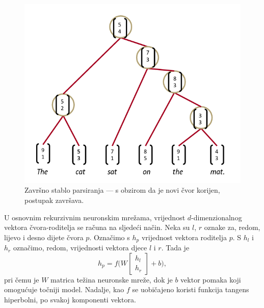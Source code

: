 \documentclass[a4paper,twoside,12pt]{memoir} %
\begin{document}
	\begin{figure}[H]
		\centering
		\vspace*{-24pt}
		\includegraphics[scale = 0.70]{recursive_parse_4.png}

		\vspace*{-6pt}
		\caption{Završno stablo parsiranja --- s obzirom da je novi čvor korijen, postupak završava.}
	\end{figure}

	U osnovnim rekurzivnim neuronskim mrežama, vrijednost $d$-dimenzionalnog vektora čvora-roditelja se računa na sljedeći način. Neka su $l$, $r$ oznake za, redom, lijevo i desno dijete čvora $p$. Označimo s $h_p$ vrijednost vektora roditelja $p$. S $h_l$ i $h_r$ označimo, redom, vrijednosti vektora djece $l$ i $r$. Tada je
	\begin{equation*}
	h_p = f \bigg(
	W
	\begin{bmatrix}
	h_l \\
	h_r
	\end{bmatrix}
	+ b
	\bigg),
	\end{equation*}
	pri čemu je $W$ matrica težina neuronske mreže, dok je $b$ vektor pomaka koji omogućuje točniji model. Nadalje, kao $f$ se uobičajeno koristi funkcija tangens hiperbolni, po svakoj komponenti vektora.
\end{document}
